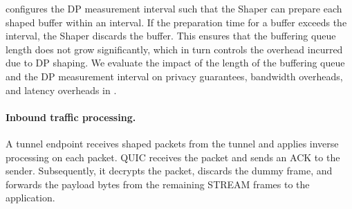 {\sys} configures the DP measurement interval such that the Shaper can prepare each shaped buffer within an interval.
If the preparation time for a buffer exceeds the interval, the Shaper discards the buffer.
This ensures that the buffering queue length does not grow significantly, which in turn controls the overhead incurred due to DP shaping.
We evaluate the impact of the length of the buffering queue and the DP
measurement interval on privacy guarantees, bandwidth overheads, and latency
overheads in {\addref}.

\paragraph{Inbound traffic processing.}
A tunnel endpoint receives shaped packets from the tunnel and applies inverse
processing on each packet.
QUIC receives the packet and
sends an ACK to the sender. Subsequently, it decrypts the packet, discards the
dummy frame, and forwards the payload bytes from the remaining STREAM frames to
the application.

